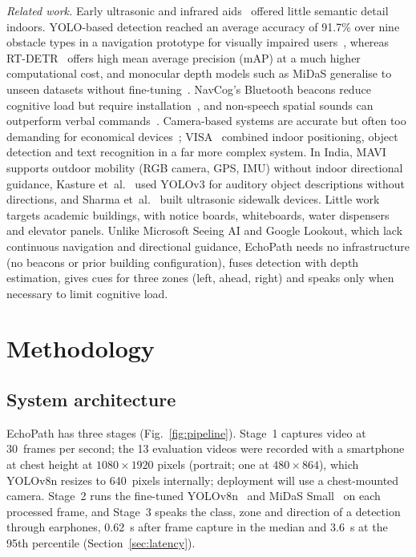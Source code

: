 \documentclass[3p,times,procedia]{elsarticle}
\DeclareRobustCommand{\rev}[1]{{\hlattr=1 #1}}
\DeclareRobustCommand{\rev}[1]{\hl{#1}}
\DeclareRobustCommand{\rev}[1]{#1}
\begin{document}
\emph{Related work.} Early ultrasonic and infrared aids~\cite{bhatlawande2014}
offered little semantic detail indoors. YOLO-based detection reached an
average accuracy of 91.7\% over nine obstacle types in a navigation
prototype for visually impaired users~\cite{li2020yolo}, whereas
RT-DETR~\cite{zhao2023rtdetr} offers high mean average precision (mAP) at a
much higher computational cost, and monocular depth models such as
MiDaS generalise to unseen datasets without fine-tuning~\cite{ranftl2020midas}.
NavCog's Bluetooth beacons reduce cognitive load but require
installation~\cite{ahmetovic2016navcog}, and non-speech spatial sounds can
outperform verbal commands~\cite{ahmetovic2019sonification}. Camera-based
systems are accurate but often too demanding for economical
devices~\cite{messaoudi2022}; VISA~\cite{yu2025visa} combined indoor
positioning, object detection and text recognition in a far more complex
system. In India, MAVI~\cite{kedia2017mavi} supports outdoor mobility (RGB
camera, GPS, IMU) without indoor directional guidance, Kasture
et~al.~\cite{kasture2021} used YOLOv3 for auditory object descriptions
without directions, and Sharma et~al.~\cite{sharma2020} built ultrasonic
sidewalk devices. Little work targets academic buildings, with notice
boards, whiteboards, water dispensers and elevator panels. Unlike Microsoft
Seeing AI and Google Lookout, which lack continuous navigation and
directional guidance, EchoPath needs no infrastructure (no beacons or prior
building configuration), fuses detection with depth estimation, gives cues
for three zones (left, ahead, right) and speaks only when necessary to limit
cognitive load.

\section{Methodology}
\label{sec:method}

\subsection{System architecture}

EchoPath has three stages (Fig.~\ref{fig:pipeline}). Stage~1 captures
video at 30~frames per second; the 13 evaluation videos were recorded
with a smartphone at chest height at $1080 \times 1920$ pixels (portrait;
one at $480 \times 864$), which YOLOv8n resizes to 640~pixels internally;
deployment will use a chest-mounted camera. Stage~2 runs the fine-tuned
YOLOv8n~\cite{jocher2023yolov8} and MiDaS Small~\cite{ranftl2020midas} on
each processed frame, and Stage~3 speaks the class, zone and direction of a
detection through earphones, \rev{0.62~s after frame capture in the median
and 3.6~s at the 95th percentile} (Section~\ref{sec:latency}).
\end{document}
